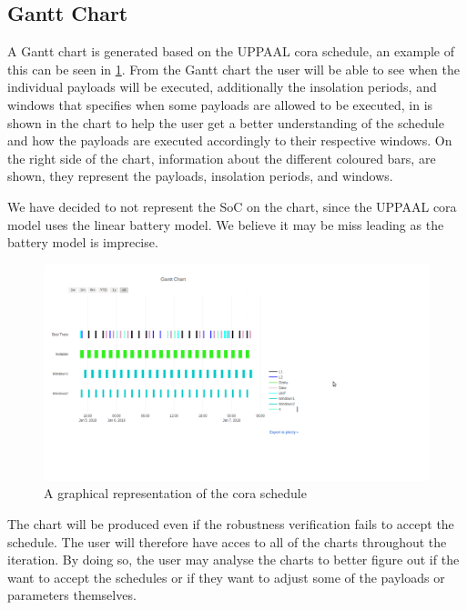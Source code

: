 \subsection{Gantt Chart} \label{subsec:gantt}
A Gantt chart is generated based on the UPPAAL \gls{cora} schedule, an example of this can be seen in \cref{fig:gantt}. From the Gantt chart the user will be able to see when the individual payloads will be executed, additionally the insolation periods, and windows that specifies when some payloads are allowed to be executed, in is shown in the chart to help the user get a better understanding of the schedule and how the payloads are executed accordingly to their respective windows. On the right side of the chart, information about the different coloured bars, are shown, they represent the payloads, insolation periods, and windows. 

We have decided to not represent the SoC on the chart, since the UPPAAL \gls{cora} model uses the linear battery model. We believe it may be miss leading as the battery model is imprecise.

\begin{figure}[!h]
	\includegraphics[width=\textwidth]{graphics/gantt.png}
	\caption{A graphical representation of the \gls{cora} schedule}
	\label{fig:gantt}
\end{figure}
The chart will be produced even if the robustness verification fails to accept the schedule. The user will therefore have acces to all of the charts throughout the iteration. By doing so, the user may analyse the charts to better figure out if the want to accept the schedules or if they want to adjust some of the payloads or parameters themselves.
